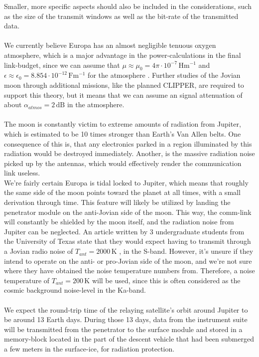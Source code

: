 Smaller, more specific aspects should also be included in the considerations, such as the size of the transmit windows as well as the bit-rate of the transmitted data.\\
\\
We currently believe Europa has an almost negligible tenuous oxygen atmosphere, which is a major advantage in the power-calculations in the final link-budget, since we can assume that $\mu\approx\mu_0=4\pi\cdot 10^{-7}\,\mathrm{Hm^{-1}}$ and $\epsilon\approx\epsilon_0=8.854\cdot 10^{-12} \,\mathrm{Fm^{-1}}$ for the atmosphere \cite{SciStrat}. Further studies of the Jovian moon through additional missions, like the planned CLIPPER, are required to support this theory, but it means that we can assume an signal attenuation of about $\alpha_{atmos}=2\,\mathrm{dB}$ in the atmosphere.\\
\\
The moon is constantly victim to extreme amounts of radiation from Jupiter, which is estimated to be 10 times stronger than Earth's Van Allen belts. One consequence of this is, that any electronics parked in a region illuminated by this radiation would be destroyed immediately. Another, is the massive radiation noise picked up by the antennas, which would effectively render the communication link useless.\\ 
We're fairly certain Europa is tidal locked to Jupiter, which means that roughly the same side of the moon points toward the planet at all times, with a small derivation through time. This feature will likely be utilized by landing the penetrator module on the anti-Jovian side of the moon. This way, the comm-link will constantly be shielded by the moon itself, and the radiation noise from Jupiter can be neglected. An article written by 3 undergraduate students from the University of Texas state that they would expect having to transmit through a Jovian radio noise of $T_{ant}=2000\,\mathrm{K}$ \cite{DORRA}, in the S-band. However, it's unsure if they intend to operate on the anti- or pro-Jovian side of the moon, and we're not sure where they have obtained the noise temperature numbers from. Therefore, a noise temperature of $T_{ant}=200\,\mathrm{K}$ will be used, since this is often considered as the cosmic background noise-level in the Ka-band.\\
\\
We expect the round-trip time of the relaying satellite's orbit around Jupiter to be around 13 Earth days. During those 13 days, data from the instrument suite will be transmitted from the penetrator to the surface module and stored in a memory-block located in the part of the descent vehicle that had been submerged a few meters in the surface-ice, for radiation protection.\\
